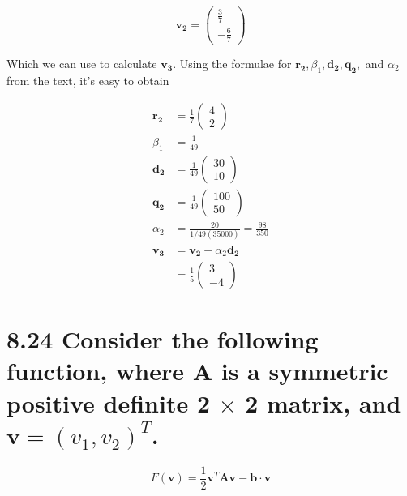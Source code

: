 \documentclass{article}
\let\vec\mathbf
\begin{document}
\begin{enumerate}[(a)]
    \[
      \vec{v_2} = 
      \begin{pmatrix}
        \frac{3}{7} \\ -\frac{6}{7}
      \end{pmatrix}
    \]

    Which we can use to calculate $\vec{v_3}$. Using the formulae for $\vec{r_2}, \beta_1, \vec{d_2}, \vec{q_2},$ and $\alpha_2$ from the text, it's easy to obtain

    \begin{align*}
      \vec{r_2} &= \frac{1}{7}
      \begin{pmatrix}
        4 \\ 2
      \end{pmatrix} \\
      \beta_1 &= \frac{1}{49} \\
      \vec{d_2} &= \frac{1}{49}
      \begin{pmatrix}
        30 \\ 10
      \end{pmatrix} \\
      \vec{q_2} &= \frac{1}{49}
      \begin{pmatrix}
        100 \\ 50
      \end{pmatrix} \\
      \alpha_2 &= \frac{20}{1/49 (35000)} = \frac{98}{350} \\
      \vec{v_3} &= \vec{v_2} + \alpha_2\vec{d_2} \\
      &= \frac{1}{5}
      \begin{pmatrix}
        3 \\ -4
      \end{pmatrix}
    \end{align*}




\end{enumerate}






\section*{8.24 \normalsize Consider the following function, where $\vec{A}$ is a symmetric positive definite 2 $\times$ 2 matrix, and $\vec{v} = (v_1, v_2)^T$.}

$$F(\vec{v}) = \frac{1}{2} \vec{v}^T \vec{A} \vec{v} - \vec{b} \cdot \vec{v}$$
\end{document}
